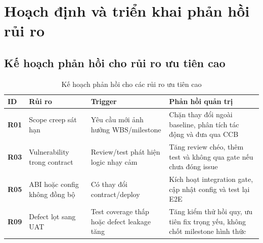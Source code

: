 \section{Hoạch định và triển khai phản hồi rủi ro}

\subsection{Kế hoạch phản hồi cho rủi ro ưu tiên cao}

\begin{table}[H]
\centering
\caption{Kế hoạch phản hồi cho các rủi ro ưu tiên cao}
\label{tab:risk-response-plan}
\begin{tabularx}{\textwidth}{| >{\bfseries}p{1.1cm} | p{3.6cm} | p{3cm} | X |}
\hline
ID & Rủi ro & Trigger & Phản hồi quản trị \\
\hline
R01 & Scope creep sát hạn & Yêu cầu mới ảnh hưởng WBS/milestone & Chặn thay đổi ngoài baseline, phân tích tác động và đưa qua CCB \\ \hline
R03 & Vulnerability trong contract & Review/test phát hiện logic nhạy cảm & Tăng review chéo, thêm test và không qua gate nếu chưa đóng issue \\ \hline
R05 & ABI hoặc config không đồng bộ & Có thay đổi contract/deploy & Kích hoạt integration gate, cập nhật config và test lại E2E \\ \hline
R09 & Defect lọt sang UAT & Test coverage thấp hoặc defect leakage tăng & Tăng kiểm thử hồi quy, ưu tiên fix trọng yếu, không chốt milestone hình thức \\
\hline
\end{tabularx}
\end{table}

